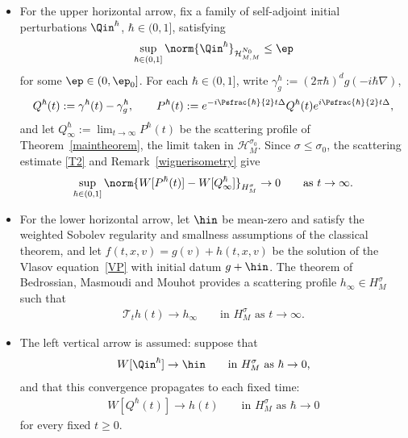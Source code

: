 \begin{itemize}
\item For the upper horizontal arrow, fix a family of self-adjoint initial perturbations $\Qin^{\hbar}$, $\hbar\in(0,1]$, satisfying
\begin{align*}
\sup_{\hbar\in(0,1]}\norm{\Qin^{\hbar}}_{\mathcal H^{N_0}_{M,M}}\leq\ep
\end{align*}
for some $\ep\in(0,\ep_0]$. For each $\hbar\in(0,1]$, write $\gamma_g^{\hbar}:=(2\pi\hbar)^dg(-i\hbar\nabla)$,
\begin{align*}
Q^{\hbar}(t):=\gamma^{\hbar}(t)-\gamma_g^{\hbar},\qquad P^{\hbar}(t):=e^{-i\Psfrac{\hbar}{2}t\Delta}Q^{\hbar}(t)e^{i\Psfrac{\hbar}{2}t\Delta},
\end{align*}
and let $Q^{\hbar}_{\infty}:=\lim_{t\to\infty}P^{\hbar}(t)$ be the scattering profile of Theorem~\ref{maintheorem}, the limit taken in $\mathcal H^{\sigma_0}_M$. Since $\sigma\leq\sigma_0$, the scattering estimate \eqref{T2} and Remark~\ref{wignerisometry} give
\begin{align}\label{uniformquantumscattering}
\sup_{\hbar\in(0,1]}\norm{W[P^{\hbar}(t)]-W[Q^{\hbar}_{\infty}]}_{H^{\sigma}_M}\to0\qquad\text{as $t\to\infty$.}
\end{align}
\item For the lower horizontal arrow, let $\hin$ be mean-zero and satisfy the weighted Sobolev regularity and smallness assumptions of the classical theorem, and let $f(t,x,v)=g(v)+h(t,x,v)$ be the solution of the Vlasov equation~\eqref{VP} with initial datum $g+\hin$. The theorem of Bedrossian, Masmoudi and Mouhot provides a scattering profile $h_\infty\in H^{\sigma}_M$ such that
\begin{align}\label{classicalscatteringprofile}
\mathcal T_th(t)\to h_\infty\qquad\text{in $H^{\sigma}_M$ as $t\to\infty$.}
\end{align}

\item The left vertical arrow is assumed: suppose that
\begin{align*}
W[\Qin^{\hbar}]\to\hin\qquad\text{in $H^{\sigma}_M$ as $\hbar\to0$,}
\end{align*}
and that this convergence propagates to each fixed time:
\begin{align}\label{fixedtimesemiclassical}
W[Q^{\hbar}(t)]\to h(t)\qquad\text{in $H^{\sigma}_M$ as $\hbar\to0$}
\end{align}
for every fixed $t\geq0$.
\end{itemize}

